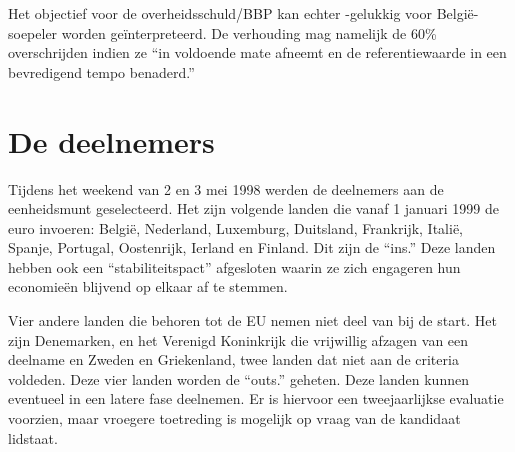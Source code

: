 \documentclass[a4paper]{article}
\begin{document}
Het objectief voor de overheidsschuld/BBP kan echter -gelukkig voor
België- soepeler worden geïnterpreteerd. De verhouding mag namelijk
de 60\% overschrijden indien ze ``in voldoende mate afneemt en de
referentiewaarde in een bevredigend tempo benaderd.''



\section{De deelnemers}

Tijdens het weekend van 2 en 3 mei 1998 werden de deelnemers aan de
eenheidsmunt geselecteerd. Het zijn volgende landen die vanaf 1
januari 1999 de euro invoeren: België, Nederland, Luxemburg,
Duitsland, Frankrijk, Italië, Spanje, Portugal, Oostenrijk, Ierland
en Finland. Dit zijn de ``ins.'' Deze landen hebben ook een
``stabiliteitspact'' afgesloten waarin ze zich engageren hun
economieën blijvend op elkaar af te stemmen.

Vier andere landen die behoren tot de EU nemen niet deel van bij de
start. Het zijn Denemarken, en het Verenigd Koninkrijk die
vrijwillig afzagen van een deelname en Zweden en Griekenland, twee
landen dat niet aan de criteria voldeden. Deze vier landen worden de
``outs.'' geheten. Deze landen kunnen eventueel in een latere fase
deelnemen. Er is hiervoor een tweejaarlijkse evaluatie voorzien,
maar vroegere toetreding is mogelijk op vraag van de kandidaat
lidstaat.
\end{document}
